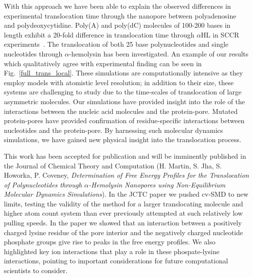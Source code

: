 \documentclass[a4paper,10pt]{article}
\newcommand{\ahl}{$\alpha$HL }
\begin{document}
With this approach we have been able to explain the observed differences in experimental translocation time through the nanopore between polyadenosine and polydeoxycytidine. Poly(A) and poly(dC) molecules of 100-200 bases in length exhibit a 20-fold difference in translocation time through \ahl in SCCR experiments~\cite{akeson}. The translocation of both 25 base polynucleotides and single nucleotides through $\alpha$-hemolysin has been investigated. An example of our results which qualitatively agree with experimental finding can be seen in Fig.~\ref{full_trans_local}. These simulations are computationally intensive as they employ models with atomistic level resolution; in addition to their size, these systems are challenging to study due to the time-scales of translocation of large asymmetric molecules. Our simulations have provided insight into the role of the interactions between the nucleic acid molecules and the protein-pore. Mutated protein-pores have provided confirmation of residue-specific interactions between nucleotides and the protein-pore. By harnessing such molecular dynamics simulations, we have gained new physical insight into the translocation process.

This work has been accepted for publication and will be imminently published in the Journal of Chemical Theory and Computation (H. Martin, S. Jha, S. Howorka, P. Coveney, {\it Determination of Free Energy Profiles for the Translocation of Polynucleotides through $\alpha$-Hemolysin Nanopores using Non-Equilibrium Molecular Dynamics Simulations}). In the JCTC paper we pushed cv-SMD to new limits, testing the validity of the method for a larger translocating molecule and higher atom count system than ever previously attempted at such relatively low pulling speeds. In the paper we showed that an interaction between a positively charged lysine residue of the pore interior and the negatively charged nucleotide phosphate groups give rise to peaks in the free energy profiles. We also highlighted key ion interactions that play a role in these phospate-lysine interactions, pointing to important considerations for future computational scientists to consider.
\end{document}
